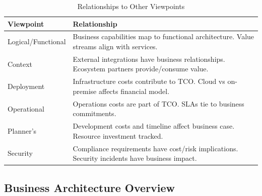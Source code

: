 \documentclass[11pt,letterpaper]{article}
\begin{document}
\begin{table}[H]
\centering
\caption{Relationships to Other Viewpoints}
\begin{tabular}{@{}L{3.5cm}L{10.5cm}@{}}
\toprule
\textbf{Viewpoint} & \textbf{Relationship} \\
\midrule
Logical/Functional & Business capabilities map to functional architecture. Value streams align with services. \\
\addlinespace
Context & External integrations have business relationships. Ecosystem partners provide/consume value. \\
\addlinespace
Deployment & Infrastructure costs contribute to TCO. Cloud vs on-premise affects financial model. \\
\addlinespace
Operational & Operations costs are part of TCO. SLAs tie to business commitments. \\
\addlinespace
Planner's & Development costs and timeline affect business case. Resource investment tracked. \\
\addlinespace
Security & Compliance requirements have cost/risk implications. Security incidents have business impact. \\
\bottomrule
\end{tabular}
\end{table}

\subsection{Business Architecture Overview}
\end{document}

